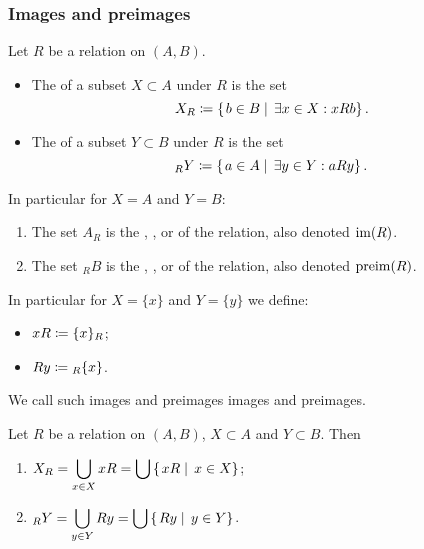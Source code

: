 \subsubsection{Images and preimages}
\begin{definition}
Let $R$ be a relation on $(A, B)$.
\begin{itemize}
\item The  of a subset $X\subset A$ under $R$ is the set
\[ X_R \coloneqq \left\{\left. b\in B \;\right|\; \exists x\in X: xRb \right\}. \]
\item The  of a subset $Y\subset B$ under $R$ is the set
\[ _RY \coloneqq \left\{\left. a\in A \;\right|\; \exists y\in Y: aRy \right\}. \]
\end{itemize}
In particular for $X=A$ and $Y=B$:
\begin{enumerate}
\item The set $A_R$ is the , ,  or  of the relation, also denoted $\operatorname{im}(R)$.
\item The set $_RB$ is the , ,  or  of the relation, also denoted $\operatorname{preim}(R)$.
\end{enumerate}
In particular for $X = \{x\}$ and $Y = \{y\}$ we define:
\begin{itemize}
\item $xR \coloneqq \{x\}_R$;
\item $Ry \coloneqq {_R\{x\}}$.
\end{itemize}
We call such images and preimages  images and preimages.
\end{definition}

\begin{lemma}
Let $R$ be a relation on $(A, B)$, $X\subset A$ and $Y\subset B$. Then
\begin{enumerate}
\item $X_R = \displaystyle\bigcup_{x\in X}xR = \bigcup \left\{\left. xR \;\right|\; x\in X \right\}$;
\item $_RY = \displaystyle\bigcup_{y\in Y}Ry = \bigcup \left\{\left. Ry \;\right|\; y\in Y \right\}$.
\end{enumerate}
\end{lemma}


